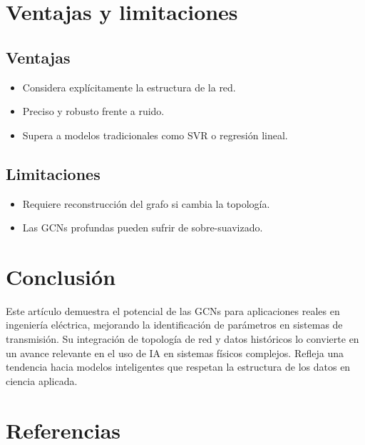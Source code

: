 \documentclass[11pt]{article}
\begin{document}
\section{Ventajas y limitaciones}
\subsection*{Ventajas}
\begin{itemize}
    \item Considera explícitamente la estructura de la red.
    \item Preciso y robusto frente a ruido.
    \item Supera a modelos tradicionales como SVR o regresión lineal.
\end{itemize}

\subsection*{Limitaciones}
\begin{itemize}
    \item Requiere reconstrucción del grafo si cambia la topología.
    \item Las GCNs profundas pueden sufrir de sobre-suavizado.
\end{itemize}

\section{Conclusión}
Este artículo demuestra el potencial de las GCNs para aplicaciones reales en ingeniería eléctrica, mejorando la identificación de parámetros en sistemas de transmisión. Su integración de topología de red y datos históricos lo convierte en un avance relevante en el uso de IA en sistemas físicos complejos. Refleja una tendencia hacia modelos inteligentes que respetan la estructura de los datos en ciencia aplicada.

\clearpage  %

\section{Referencias}


\end{document}
